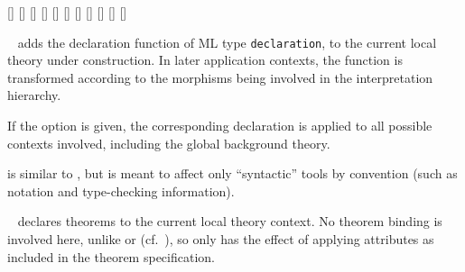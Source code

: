 \begin{isabellebody}
\begin{isamarkuptext}
  \begin{railoutput}
\rail@bar
{}[]
[]
\rail@endbar
\rail@bar
{}
[]
[]
[]
\rail@endbar
{}
\rail@bar
{}
[]
\rail@endbar
{}[]
\rail@end
{}
[]
\rail@bar
{}
[]
\rail@endbar
\rail@plus
{}[]
[]
\rail@endplus
\rail@end
\end{railoutput}


  \begin{description}

  \item \hyperlink{command.declaration}{\mbox{}}~ adds the declaration
  function  of ML type \verb|declaration|, to the current
  local theory under construction.  In later application contexts, the
  function is transformed according to the morphisms being involved in
  the interpretation hierarchy.

  If the  option is given, the corresponding
  declaration is applied to all possible contexts involved, including
  the global background theory.

  \item \hyperlink{command.syntax-declaration}{\mbox{}} is similar to \hyperlink{command.declaration}{\mbox{}}, but is meant to affect only ``syntactic'' tools by
  convention (such as notation and type-checking information).

  \item \hyperlink{command.declare}{\mbox{}}~ declares theorems to the
  current local theory context.  No theorem binding is involved here,
  unlike \hyperlink{command.theorems}{\mbox{}} or \hyperlink{command.lemmas}{\mbox{}} (cf.\
  ), so \hyperlink{command.declare}{\mbox{}} only has the effect
  of applying attributes as included in the theorem specification.


\end{description}
\end{isamarkuptext}
\end{isabellebody}
